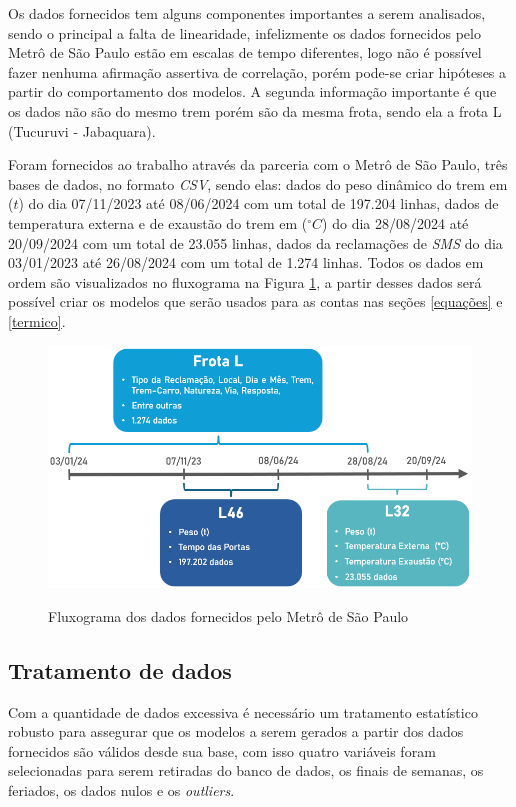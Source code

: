 \documentclass[acronym,symbols,table]{fei}
\begin{document}
Os dados fornecidos tem alguns componentes importantes a serem analisados, sendo o principal  a falta de linearidade, infelizmente os dados fornecidos pelo Metrô de São Paulo estão em escalas de tempo diferentes, logo não é possível fazer nenhuma afirmação assertiva de correlação, porém pode-se criar hipóteses a partir do comportamento dos modelos. A segunda informação importante é que os dados não são do mesmo trem porém são da mesma frota, sendo ela a frota L (Tucuruvi - Jabaquara).

Foram fornecidos ao trabalho através da parceria com o Metrô de São Paulo, três bases de dados, no formato \textit{CSV}, sendo elas: dados do peso dinâmico do trem em ($t$) do dia 07/11/2023 até 08/06/2024 com um total de 197.204 linhas, dados de temperatura externa e de exaustão do trem em ($^{\circ}C$) do dia 28/08/2024 até 20/09/2024 com um total de 23.055 linhas, dados da reclamações de \textit{SMS} do dia 03/01/2023 até 26/08/2024 com um total de 1.274 linhas. Todos os dados em ordem são visualizados no fluxograma na Figura \ref{fig:Fluxograma_dos_dados}, a partir desses dados será possível criar os modelos que serão usados para as contas nas seções \ref{equações} e \ref{termico}.

\begin{figure}[!htb]
    \centering
    \caption{Fluxograma dos dados fornecidos pelo Metrô de São Paulo}
    \includegraphics[width=0.8\linewidth]{Imagens/Fluxograma_dos_dados.png} %
    \label{fig:Fluxograma_dos_dados}
\end{figure}

\subsection{Tratamento de dados}

Com a quantidade de dados excessiva é necessário um tratamento estatístico robusto para assegurar que os modelos a serem gerados a partir dos dados fornecidos são válidos desde sua base, com isso quatro variáveis foram selecionadas para serem retiradas do banco de dados, os finais de semanas, os feriados, os dados nulos e os \textit{outliers}.
\end{document}
